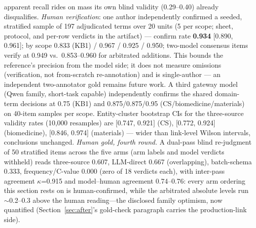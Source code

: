 \documentclass[preprint,12pt]{elsarticle}
\begin{document}
apparent recall rides on mass its own blind validity (0.29--0.40)
already disqualifies. \emph{Human verification}: one author
independently confirmed a seeded, stratified sample of 197 adjudicated
terms over 20 units (5 per scope; sheet, protocol, and per-row
verdicts in the artifact) --- confirm rate \textbf{0.934} [0.890,
0.961]; by scope 0.833 (KB1) / 0.967 / 0.925 / 0.950; two-model
consensus items verify at 0.949 vs.\ 0.853--0.960 for arbitrated
additions. This bounds the reference's precision from the model side;
it does not measure omissions (verification, not from-scratch
re-annotation) and is single-author --- an independent two-annotator
gold remains future work. A third gateway model (Qwen family, short-task capable) independently confirms the shared domain-term decisions at 0.75 (KB1) and 0.875/0.875/0.95 (CS/biomedicine/materials) on 40-item samples per scope. Entity-cluster bootstrap CIs for the three-source
validity rates (10{,}000 resamples) are [0.747, 0.921] (CS),
[0.772, 0.924] (biomedicine), [0.846, 0.974] (materials) --- wider
than link-level Wilson intervals, conclusions unchanged.
\emph{Human gold, fourth round.} A dual-pass blind re-judgment of 50
stratified items across the five arms (arm labels and model verdicts
withheld) reads three-source 0.607, LLM-direct 0.667 (overlapping),
batch-schema 0.333, frequency/C-value 0.000 (zero of 18 verdicts
each), with inter-pass agreement $\kappa$=0.915 and model--human
agreement 0.74--0.76: every arm ordering this section rests on is
human-confirmed, while the arbitrated absolute levels run
${\sim}$0.2--0.3 above the human reading---the disclosed family
optimism, now quantified (Section~\ref{sec:after}'s gold-check
paragraph carries the production-link side).
\end{document}

